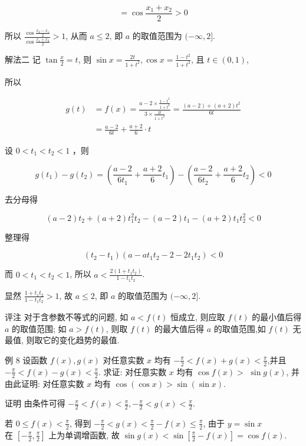 $$
	=\cos \frac{x_{1}+x_{2}}{2}>0
$$

所以 $\frac{\cos \frac{x_{2}-x_{1}}{2}}{\cos \frac{x_{1}+x_{2}}{2}}>1$, 从而 $a \leqslant 2$, 即 $a$ 的取值范围为 $(-\infty, 2]$.

解法二 记 $\tan \frac{x}{2}=t$, 则 $\sin x=\frac{2 t}{1+t^{2}}, \cos x=\frac{1-t^{2}}{1+t^{2}}$, 且 $t \in(0,1)$,

所以

$$
	\begin{aligned}
		g(t) & =f(x)=\frac{a-2 \times \frac{1-t^{2}}{1+t^{2}}}{3 \times \frac{2 t}{1+t^{2}}}=\frac{(a-2)+(a+2) t^{2}}{6 t} \\
		     & =\frac{a-2}{6 t}+\frac{a+2}{6} \cdot t
	\end{aligned}
$$

设 $0<t_{1}<t_{2}<1$ ，则

$$
	g\left(t_{1}\right)-g\left(t_{2}\right)=\left(\frac{a-2}{6 t_{1}}+\frac{a+2}{6} t_{1}\right)-\left(\frac{a-2}{6 t_{2}}+\frac{a+2}{6} t_{2}\right)<0
$$

去分母得

$$
	(a-2) t_{2}+(a+2) t_{1}^{2} t_{2}-(a-2) t_{1}-(a+2) t_{1} t_{2}^{2}<0
$$

整理得

$$
	\left(t_{2}-t_{1}\right)\left(a-a t_{1} t_{2}-2-2 t_{1} t_{2}\right)<0
$$

而 $0<t_{1}<t_{2}<1$, 所以 $a<\frac{2\left(1+t_{1} t_{2}\right)}{1-t_{1} t_{2}}$.

显然 $\frac{1+t_{1} t_{2}}{1-t_{1} t_{2}}>1$, 故 $a \leqslant 2$, 即 $a$ 的取值范围为 $(-\infty, 2]$.

评注 对于含参数不等式的问题, 如 $a<f(t)$ 恒成立, 则应取 $f(t)$ 的最小值后得 $a$ 的取值范围; 如 $a>f(t)$, 则取 $f(t)$ 的最大值后得 $a$ 的取值范围,如 $f(t)$ 无最值, 则取它的变化趋势的最值.

例 8 设函数 $f(x), g(x)$ 对任意实数 $x$ 均有 $-\frac{\pi}{2}<f(x)+g(x)<\frac{\pi}{2}$,并且 $-\frac{\pi}{2}<f(x)-g(x)<\frac{\pi}{2}$. 求证: 对任意实数 $x$ 均有 $\cos f(x)>$ $\sin g(x)$, 并由此证明: 对任意实数 $x$ 均有 $\cos (\cos x)>\sin (\sin x)$.

证明 由条件可得 $-\frac{\pi}{2}<f(x)<\frac{\pi}{2},-\frac{\pi}{2}<g(x)<\frac{\pi}{2}$.

若 $0 \leqslant f(x)<\frac{\pi}{2}$, 得到 $-\frac{\pi}{2}<g(x)<\frac{\pi}{2}-f(x) \leqslant \frac{\pi}{2}$, 由于 $y=\sin x$\\
在 $\left[-\frac{\pi}{2}, \frac{\pi}{2}\right]$ 上为单调增函数, 故 $\sin g(x)<\sin \left[\frac{\pi}{2}-f(x)\right]=\cos f(x)$.

